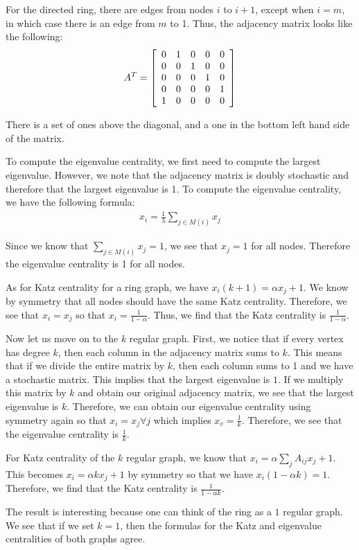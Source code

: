 \documentclass[psamsfonts]{amsart}
\newenvironment{sol}{{\bfseries Solution:}}{\qedsymbol}
\begin{document}
\begin{sol}
For the directed ring, there are edges from nodes $i$ to $i+1$, except when $i = m$, in which case there is an edge from $m$ to 1. Thus, the adjacency matrix looks like the following:
\begin{eqnarray}
  A^T = \left[
  \begin{array}{c c c c c}
    0 & 1 & 0 & 0 & 0 \\
    0 & 0 & 1 & 0 & 0 \\
    0 & 0 & 0 & 1 & 0 \\
    0 & 0 & 0 & 0 & 1 \\
    1 & 0 & 0 & 0 & 0
  \end{array}
  \right]
\end{eqnarray}

There is a set of ones above the diagonal, and a one in the bottom left hand side of the matrix.

To compute the eigenvalue centrality, we first need to compute the largest eigenvalue. However, we note that the adjacency matrix is doubly stochastic and therefore that the largest eigenvalue is 1. To compute the eigenvalue centrality, we have the following formula:
\begin{eqnarray}
  x_i = \frac{1}{\lambda} \sum_{j \in M(i)} x_j
\end{eqnarray}

Since we know that $\sum_{j \in M(i)} x_j = 1$, we see that $x_j = 1$ for all nodes. Therefore the eigenvalue centrality is 1 for all nodes.

As for Katz centrality for a ring graph, we have $x_{i}(k+1) = \alpha x_j + 1$. We know by symmetry that all nodes should have the same Katz centrality. Therefore, we see that $x_{i} = x_{j}$ so that $x_i = \frac{1}{1-\alpha}$. Thus, we find that the Katz centrality is $\frac{1}{1- \alpha}$.

Now let us move on to the $k$ regular graph. First, we notice that if every vertex has degree $k$, then each column in the adjacency matrix sums to $k$. This means that if we divide the entire matrix by $k$, then each column sums to 1 and we have a stochastic matrix. This implies that the largest eigenvalue is $1$. If we multiply this matrix by $k$ and obtain our original adjacency matrix, we see that the largest eigenvalue is $k$. Therefore, we can obtain our eigenvalue centrality using symmetry again so that $x_i = x_j \forall j$ which implies $x_v = \frac{1}{k}$. Therefore, we see that the eigenvalue centrality is $\frac{1}{k}$.

For Katz centrality of the $k$ regular graph, we know that $x_i = \alpha \sum_{j} A_{ij} x_j + 1$. This becomes $x_i = \alpha k x_j + 1$ by symmetry so that we have $x_i (1 - \alpha k) = 1$. Therefore, we find that the Katz centrality is $\frac{1}{1 - \alpha k}$.

The result is interesting because one can think of the ring as a $1$ regular graph. We see that if we set $k=1$, then the formulas for the Katz and eigenvalue centralities of both graphs agree.
\end{sol}
\end{document}
